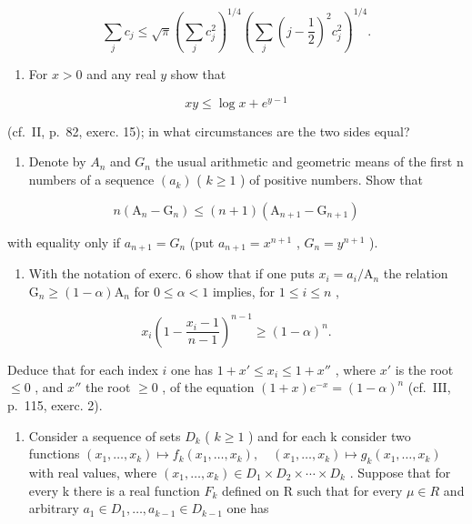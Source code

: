 \[
\sum_ {j} c _ {j} \leqslant \sqrt {\pi} \left(\sum_ {j} c _ {j} ^ {2}\right) ^ {1 / 4} \left(\sum_ {j} \left(j - \frac {1}{2}\right) ^ {2} c _ {j} ^ {2}\right) ^ {1 / 4}.
\]

\begin{enumerate}
\def\labelenumi{\arabic{enumi})}
\setcounter{enumi}{4}
\tightlist
\item
  For \(x > 0\) and any real \(y\) show that
\end{enumerate}

\[
x y \leqslant \log x + e ^ {y - 1}
\]

(cf.~II, p.~82, exerc. 15); in what circumstances are the two sides equal?

\begin{enumerate}
\def\labelenumi{\arabic{enumi})}
\setcounter{enumi}{5}
\tightlist
\item
  Denote by \(A_{n}\) and \(G_{n}\) the usual arithmetic and geometric means of the first n numbers of a sequence \((a_{k})\) ( \(k \geqslant 1\) ) of positive numbers. Show that
\end{enumerate}

\[
n \left(\mathrm{A} _ {n} - \mathrm{G} _ {n}\right) \leqslant (n + 1) \left(\mathrm{A} _ {n + 1} - \mathrm{G} _ {n + 1}\right)
\]

with equality only if \(a_{n+1} = G_{n}\) (put \(a_{n+1} = x^{n+1}\) , \(G_{n} = y^{n+1}\) ).

\begin{enumerate}
\def\labelenumi{\arabic{enumi})}
\setcounter{enumi}{6}
\tightlist
\item
  With the notation of exerc. 6 show that if one puts \(x_{i} = a_{i} / \mathrm{A}_{n}\) the relation \(\mathrm{G}_n \geqslant (1 - \alpha)\mathrm{A}_n\) for \(0 \leqslant \alpha < 1\) implies, for \(1 \leqslant i \leqslant n\) ,
\end{enumerate}

\[
x _ {i} \left(1 - \frac {x _ {i} - 1}{n - 1}\right) ^ {n - 1} \geqslant (1 - \alpha) ^ {n}.
\]

Deduce that for each index \(i\) one has \(1 + x' \leqslant x_i \leqslant 1 + x''\) , where \(x'\) is the root \(\leqslant 0\) , and \(x''\) the root \(\geqslant 0\) , of the equation \((1 + x)e^{-x} = (1 - \alpha)^n\) (cf.~III, p.~115, exerc. 2).

\begin{enumerate}
\def\labelenumi{\arabic{enumi})}
\setcounter{enumi}{7}
\tightlist
\item
  Consider a sequence of sets \(D_{k}\) ( \(k \geqslant 1\) ) and for each k consider two functions \((x_{1}, \ldots, x_{k}) \mapsto f_{k}(x_{1}, \ldots, x_{k}), \quad (x_{1}, \ldots, x_{k}) \mapsto g_{k}(x_{1}, \ldots, x_{k})\) with real values, where \((x_{1}, \ldots, x_{k}) \in D_{1} \times D_{2} \times \cdots \times D_{k}\) . Suppose that for every k there is a real function \(F_{k}\) defined on R such that for every \(\mu \in R\) and arbitrary \(a_{1} \in D_{1}, \ldots, a_{k-1} \in D_{k-1}\) one has
\end{enumerate}

